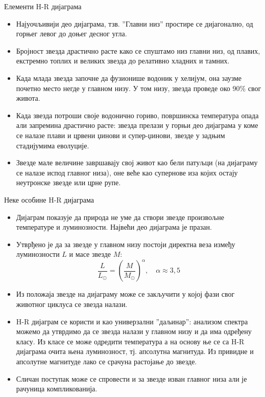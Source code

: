 \documentclass[aspectratio=169, xcolor=table, 10pt]{beamer}
\begin{document}
\begin{frame}{Елементи H-R дијаграма}
  \begin{itemize}
    \item Најуочљивији део дијаграма, тзв. ”Главни низ” простире се дијагонално, од горњег левог до доњег десног угла.
    \item Бројност звезда драстично расте како се спуштамо низ главни низ, од плавих, екстремно топлих и великих звезда до релативно хладних и тамних.
    \item Када млада звезда започне да фузионише водоник у хелијум, она заузме почетно место негде у главном низу. У том низу, звезда проведе око 90\% свог живота.
    \item Када звезда потроши своје водонично гориво, површинска температура опада али запремина драстично расте: звезда прелази у горњи део дијаграма у коме се налазе плави и црвени џинови и супер-џинови, звезде у задњим стадијумима еволуције.
    \item Звезде мале величине завршавају свој живот као бели патуљци (на дијаграму се налазе испод главног низа), оне веће као супернове иза којих остају неутронске звезде или црне рупе.
  \end{itemize}
\end{frame}

\begin{frame}{Неке особине H-R дијаграма}
  \begin{itemize}
    \item Дијаграм показује да природа не уме да створи звезде произвољне температуре и луминозности. Највећи део дијаграма је празан.
    \item Утврђено је да за звезде у главном низу постоји директна веза између луминозности $L$ и масе звезде $M$:
      \begin{equation*}
        \frac{L}{L_\odot}=\left(\frac{M}{M_\odot}\right)^\alpha,\quad \alpha\approx 3,5
      \end{equation*}
    \item Из положаја звезде на дијаграму може се закључити у којој фази свог животног циклуса се звезда налази.
    \item H-R дијаграм се користи и као универзални ”даљинар”: анализом спектра можемо да утврдимо да се звезда налази у главном низу и да има одређену класу. Из класе се може одредити температура а на основу ње се са H-R дијаграма очита њена луминозност, тј. апсолутна магнитуда. Из привидне и апсолутне магнитуде лако се срачуна растојање до звезде.
    \item Сличан поступак може се спровести и за звезде изван главног низа али је рачуница компликованија.
  \end{itemize}
\end{frame}
\end{document}
